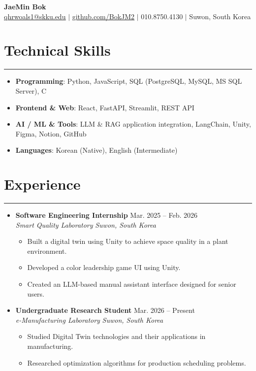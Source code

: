 \documentclass[letterpaper, 10pt]{article}
\begin{document}
\begin{center}
    \textbf{\LARGE JaeMin Bok} \\ \vspace{1pt}
    \href{mailto:qhrwoals1@skku.edu}{\underline{qhrwoals1@skku.edu}} $|$
    \href{https://github.com/BokJM2}{\underline{github.com/BokJM2}} $|$
    010.8750.4130 $|$
    Suwon, South Korea
\end{center}
\section*{Technical Skills}
\hrule
\vspace{1pt}
\begin{itemize}
    \item[] \textbf{Programming}: Python, JavaScript, SQL (PostgreSQL, MySQL, MS SQL Server), C
    \item[] \textbf{Frontend \& Web}: React, FastAPI, Streamlit, REST API
    \item[] \textbf{AI / ML \& Tools}: LLM \& RAG application integration, LangChain, Unity, Figma, Notion, GitHub
    \item[] \textbf{Languages}: Korean (Native), English (Intermediate)
\end{itemize}
\section*{Experience}
\hrule
\vspace{1pt}
\begin{itemize}
    \item[]
        \textbf{Software Engineering Internship} \hfill Mar. 2025 -- Feb. 2026 \\
        \textit{Smart Quality Laboratory} \hfill \textit{Suwon, South Korea}
        \begin{itemize}
            \item Built a digital twin using Unity to achieve space quality in a plant environment.
            \item Developed a color leadership game UI using Unity.
            \item Created an LLM-based manual assistant interface designed for senior users.
        \end{itemize}
    \item[]
        \textbf{Undergraduate Research Student} \hfill Mar. 2026 -- Present \\
        \textit{e-Manufacturing Laboratory} \hfill \textit{Suwon, South Korea}
        \begin{itemize}
            \item Studied Digital Twin technologies and their applications in manufacturing.
            \item Researched optimization algorithms for production scheduling problems.
        \end{itemize}
\end{itemize}
\end{document}
